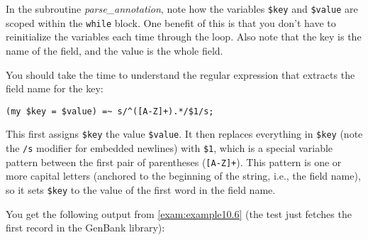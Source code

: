In the subroutine \textit{parse\_annotation}, note how the variables \verb|$key| and \verb|$value| are scoped within the \verb|while| block. One benefit of this is that you don't have to reinitialize the variables each time through the loop.  Also note that the key is the name of the field, and the value is the whole field.

You should take the time to understand the regular expression that extracts the field name for the key: 

\begin{lstlisting}
(my $key = $value) =~ s/^([A-Z]+).*/$1/s;
\end{lstlisting}

This first assigns \verb|$key| the value \verb|$value|. It then replaces everything in \verb|$key| (note the \verb|/s| modifier for embedded newlines) with \verb|$1|, which is a special variable pattern between the first pair of parentheses (\verb|[A-Z]+|).  This pattern is one or more capital letters (anchored to the beginning of the string, i.e., the field name), so it sets \verb|$key| to the value of the first word in the field name.

You get the following output from \autoref{exam:example10.6} (the test just fetches the first record in the GenBank library): 

